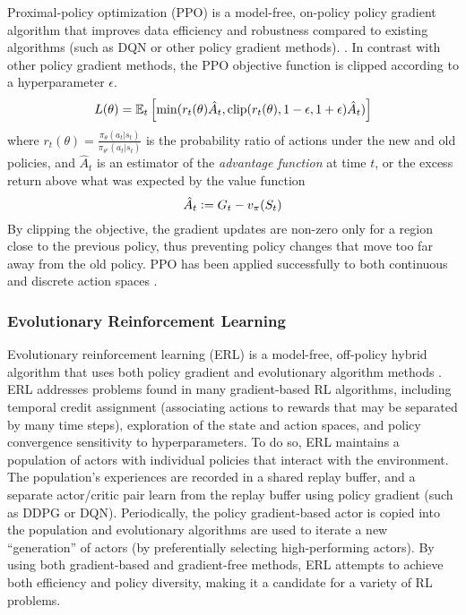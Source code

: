 Proximal-policy optimization (PPO) is a model-free, on-policy policy gradient algorithm that improves data efficiency and robustness compared to existing algorithms (such as DQN or other policy gradient methods).
\cite{schulman2017proximal}.
In contrast with other policy gradient methods, the PPO objective function is clipped according to a hyperparameter $\epsilon$.
\begin{equation}\label{eq:ppo_loss}
    L(\theta) = \mathbb E_t \left[\min(
        r_t(\theta)\hat{A}_t,
        \text{clip}(r_t(\theta), 1-\epsilon, 1+\epsilon) \hat{A}_t
    )\right]
\end{equation}
where
$r_t(\theta) = \frac{\pi_\theta(a_t|s_t)}{\pi_{\theta'}(a_t|s_t)}$ is the probability ratio of actions under the new and old policies, and $\hat{A}_t$ is an estimator of the \emph{advantage function} at time $t$, or the excess return above what was expected by the value function
\[
\hat{A}_t \mathrel{\mathop:}= G_t - v_\pi(S_t)
\]
By clipping the objective, the gradient updates are non-zero only for a region close to the previous policy, thus preventing policy changes that move too far away from the old policy.
PPO has been applied successfully to both continuous and discrete action spaces%
.

\subsubsection{Evolutionary Reinforcement Learning}

Evolutionary reinforcement learning (ERL) is a model-free, off-policy hybrid algorithm that uses both policy gradient and evolutionary algorithm methods \cite{khadka2018evolutionguided}. ERL addresses problems found in many  gradient-based RL algorithms, including temporal credit assignment (associating actions to rewards that may be separated by many time steps), exploration of the state and action spaces, and policy convergence sensitivity to hyperparameters. To do so, ERL maintains a population of actors with individual policies that interact with the environment. The population's experiences are recorded in a shared replay buffer, and a separate actor/critic pair learn from the replay buffer using policy gradient (such as DDPG or DQN). Periodically, the policy gradient-based actor is copied into the population and evolutionary algorithms are used to iterate a new ``generation'' of actors (by preferentially selecting high-performing actors). By using both gradient-based and gradient-free methods, ERL attempts to achieve both efficiency and policy diversity, making it a candidate for a variety of RL problems.


